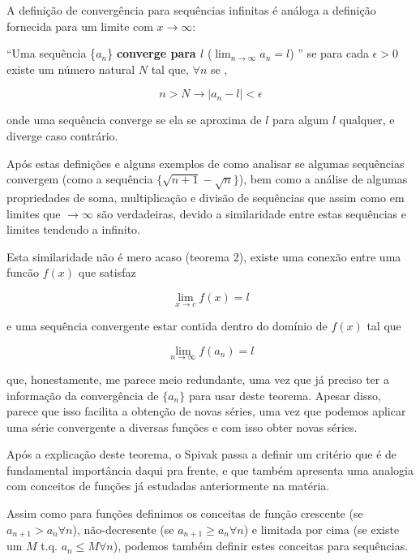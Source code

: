 \documentclass[a4paper, 12pt]{article}
\begin{document}
A definição de convergência para sequências infinitas é análoga a definição fornecida
para um limite com ${x \to \infty}$:

``Uma sequência \{$a_n$\} \textbf{converge para $l$} ($ \lim_{n \to \infty} a_n = l $) ''  se para cada
$\epsilon > 0$ existe um número natural $N$ tal que, $\forall n$ se , 

\begin{equation}
	n > N \to |a_n - l| < \epsilon 
\end{equation}

onde uma sequência converge se ela se aproxima de $l$ para algum $l$ qualquer, e diverge
caso contrário.

Após estas definições e alguns exemplos de como analisar se algumas sequências convergem
(como a sequência $\{\sqrt{n+1} - \sqrt{n}\}$), bem como a análise de algumas propriedades 
de soma, multiplicação e divisão de sequências
que assim como em limites que $\to \infty$ são verdadeiras, devido a similaridade entre
estas sequências e limites tendendo a infinito.

Esta similaridade não é mero acaso (teorema 2), existe uma conexão entre uma funcão $f(x)$ que
satisfaz

\begin{equation}
	\lim_{x \to c} f(x) = l
\end{equation}

e uma sequência convergente estar contida dentro do domínio de $f(x)$ tal que
	
\begin{equation}
	\lim_{n \to \infty} f(a_n) = l
\end{equation}

que, honestamente, me parece meio redundante, uma vez que já preciso ter a informação
da convergência de $\{a_n\}$ para usar deste teorema. Apesar disso, parece que isso facilita a 
obtenção de novas séries, uma vez que podemos aplicar uma série convergente a diversas
funções e com isso obter novas séries.

Após a explicação deste teorema, o Spivak passa a definir um critério que é de fundamental 
importância daqui pra frente, e que também apresenta uma analogia com conceitos de 
funções já estudadas anteriormente na matéria. 

Assim como para funções definimos os conceitas de função crescente (se $a_{n+1} > a_n \forall n$),
não-decresente (se $a_{n+1} \geq a_n \forall n$) e limitada por cima (se existe um $M$ t.q.
$a_n \leq M \forall n$), podemos também definir estes conceitas para sequências.
\end{document}
